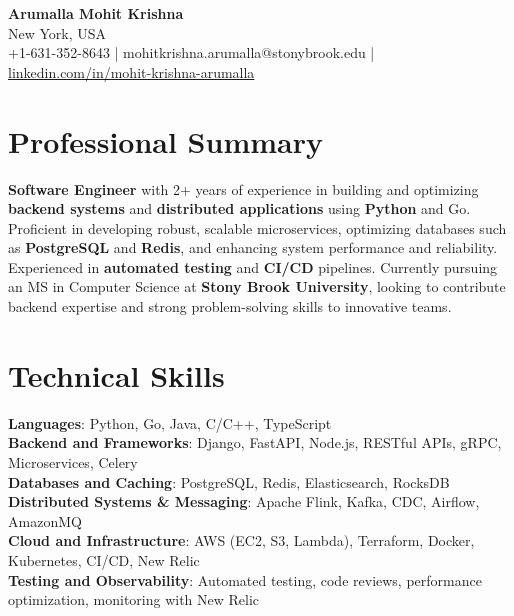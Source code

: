 \documentclass[letterpaper,11pt]{article}
\begin{document}
\begin{center}
  {\Large \textbf{Arumalla Mohit Krishna}} \\
  New York, USA \\
  +1-631-352-8643 \enspace | \enspace mohitkrishna.arumalla@stonybrook.edu \enspace | \enspace \href{https://www.linkedin.com/in/mohit-krishna-arumalla}{linkedin.com/in/mohit-krishna-arumalla}
\end{center}

\section{Professional Summary}
  \begin{itemize}[leftmargin=0.15in, label={}]
    \small{\item{
     \textbf{Software Engineer} with 2+ years of experience in building and optimizing \textbf{backend systems} and \textbf{distributed applications} using \textbf{Python} and Go. Proficient in developing robust, scalable microservices, optimizing databases such as \textbf{PostgreSQL} and \textbf{Redis}, and enhancing system performance and reliability. Experienced in \textbf{automated testing} and \textbf{CI/CD} pipelines. Currently pursuing an MS in Computer Science at \textbf{Stony Brook University}, looking to contribute backend expertise and strong problem-solving skills to innovative teams.
    }}
  \end{itemize}
\vspace{-16pt}

\section{Technical Skills}
 \begin{itemize}[leftmargin=0.15in, label={}]
    \small{\item{
     \textbf{Languages}: Python, Go, Java, C/C++, TypeScript \\
     \textbf{Backend and Frameworks}: Django, FastAPI, Node.js, RESTful APIs, gRPC, Microservices, Celery \\
     \textbf{Databases and Caching}: PostgreSQL, Redis, Elasticsearch, RocksDB \\
     \textbf{Distributed Systems \& Messaging}: Apache Flink, Kafka, CDC, Airflow, AmazonMQ \\
     \textbf{Cloud and Infrastructure}: AWS (EC2, S3, Lambda), Terraform, Docker, Kubernetes, CI/CD, New Relic \\
     \textbf{Testing and Observability}: Automated testing, code reviews, performance optimization, monitoring with New Relic
    }}
 \end{itemize}
\vspace{-16pt}
\end{document}
